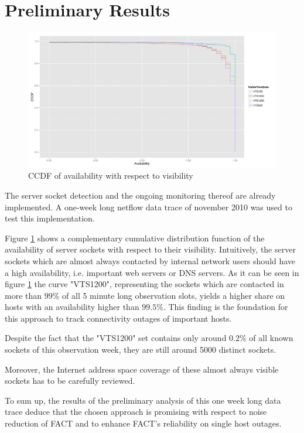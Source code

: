 \documentclass{sigcomm-alternate}
\begin{document}
\section{Preliminary Results}
\begin{figure}[ht!]
\centering
\includegraphics[width=18cm]{images/RATIO_VTS_External.pdf}
\caption{CCDF of availability with respect to visibility}
\label{fig:RatioVTS}
\end{figure}
The server socket detection and the ongoing monitoring thereof are already implemented. A one-week long netflow data trace of november 2010 was used to test this implementation. 

Figure \ref{fig:RatioVTS} shows a complementary cumulative distribution function of the availability of server sockets with respect to their visibility. Intuitively, the server sockets which are almost always contacted by internal network users should have a high availability, i.e. important web servers or DNS servers. As it can be seen in figure \ref{fig:RatioVTS} the curve "VTS1200", representing the sockets which are contacted in more than $99\%$ of all 5 minute long observation slots, yields a higher share on hosts with an availability higher than $99.5\%$. This finding is the foundation for this approach to track connectivity outages of important hosts. 

Despite the fact that the "VTS1200" set contains only around $0.2\%$ of all known sockets of this observation week, they are still around 5000 distinct sockets.

Moreover, the Internet address space coverage of these almost always visible sockets has to be carefully reviewed.

To sum up, the results of the preliminary analysis of this one week long data trace deduce that the chosen approach is promising with respect to noise reduction of FACT and to enhance FACT's reliability on single host outages.


 
% 

\end{document}
